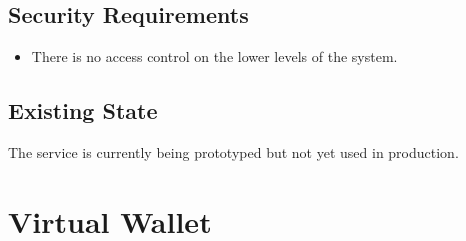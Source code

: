 \documentclass[11pt,a4paper]{report}
\begin{document}
\subsection{Security Requirements}
\begin{itemize}
\item There is no access control on the lower levels of the system.
\end{itemize}

\subsection{Existing State}
The service is currently being prototyped but not yet used in production.

\section{Virtual Wallet}
\end{document}
